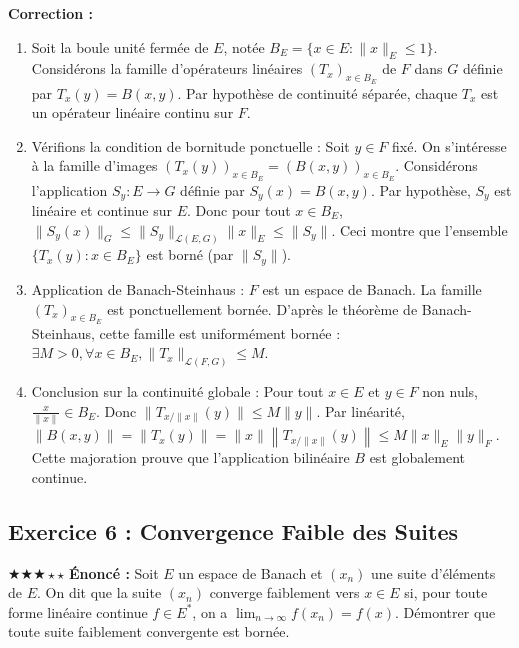 \documentclass[11pt,a4paper]{article}
\begin{document}
\textbf{Correction :}
\begin{enumerate}
\item Soit la boule unité fermée de $E$, notée $B_E = \{x \in E : \|x\|_E \le 1\}$.
   Considérons la famille d'opérateurs linéaires $(T_x)_{x \in B_E}$ de $F$ dans $G$ définie par $T_x(y) = B(x, y)$.
   Par hypothèse de continuité séparée, chaque $T_x$ est un opérateur linéaire continu sur $F$.
\item Vérifions la condition de bornitude ponctuelle :
   Soit $y \in F$ fixé. On s'intéresse à la famille d'images $(T_x(y))_{x \in B_E} = (B(x, y))_{x \in B_E}$.
   Considérons l'application $S_y : E \to G$ définie par $S_y(x) = B(x, y)$.
   Par hypothèse, $S_y$ est linéaire et continue sur $E$.
   Donc pour tout $x \in B_E$, $\|S_y(x)\|_G \le \|S_y\|_{\mathcal{L}(E,G)} \|x\|_E \le \|S_y\|$.
   Ceci montre que l'ensemble $\{T_x(y) : x \in B_E\}$ est borné (par $\|S_y\|$).
\item Application de Banach-Steinhaus :
   $F$ est un espace de Banach. La famille $(T_x)_{x \in B_E}$ est ponctuellement bornée.
   D'après le théorème de Banach-Steinhaus, cette famille est uniformément bornée :
   $\exists M > 0, \forall x \in B_E, \|T_x\|_{\mathcal{L}(F,G)} \le M$.
\item Conclusion sur la continuité globale :
   Pour tout $x \in E$ et $y \in F$ non nuls, $\frac{x}{\|x\|} \in B_E$.
   Donc $\|T_{x/\|x\|}(y)\| \le M \|y\|$.
   Par linéarité, $\|B(x, y)\| = \|T_x(y)\| = \|x\| \left\| T_{x/\|x\|}(y) \right\| \le M \|x\|_E \|y\|_F$.
   Cette majoration prouve que l'application bilinéaire $B$ est globalement continue.
\end{enumerate}
\vspace{1cm}
\subsection*{Exercice 6 : Convergence Faible des Suites}
$\bigstar\bigstar\bigstar\star\star$
\textbf{Énoncé :}
Soit $E$ un espace de Banach et $(x_n)$ une suite d'éléments de $E$.
On dit que la suite $(x_n)$ converge faiblement vers $x \in E$ si, pour toute forme linéaire continue $f \in E^*$, on a $\lim_{n \to \infty} f(x_n) = f(x)$.
Démontrer que toute suite faiblement convergente est bornée.
\end{document}
